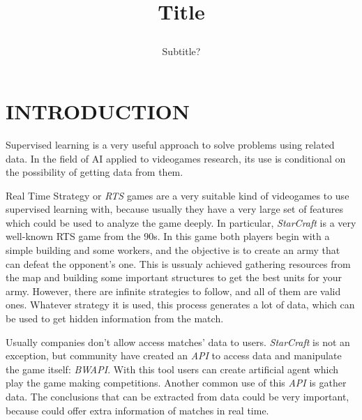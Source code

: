 \documentclass[a4paper,twoside]{article}
\begin{document}
\title{Title  \subtitle{Subtitle?} }

\author{
}



\onecolumn \maketitle \normalsize \vfill

\section{\uppercase{Introduction}}
\label{sec:introduction}


\noindent Supervised learning is a very useful approach to solve problems using
related data. In the field of AI applied to videogames research, its use is
conditional on the possibility of getting data from them.


Real Time Strategy or \emph{RTS} games are a very suitable kind of videogames
to use supervised learning with, because usually they have a very large set of
features which could be used to analyze the game deeply. In particular,
\emph{StarCraft} is a very well-known RTS game from the 90s. In this game both
players begin with a simple building and some workers, and the objective is
to create an army that can defeat the opponent's one. This is ussualy achieved
gathering resources from the map and building some important structures to get
the best units for your army. However, there are infinite strategies to follow,
and all of them are valid ones. Whatever strategy it is used, this process
generates a lot of data, which can be used to get hidden information from the
match.


Usually companies don't allow access matches' data to users. \emph{StarCraft}
is not an exception, but community have created an \emph{API} to access data
and manipulate the game itself: \emph{BWAPI}. With this tool users can create
artificial agent which play the game making competitions. Another common use
of this \emph{API} is gather data. The conclusions that can be extracted
from data could be very important, because could offer extra information
of matches in real time.
\end{document}

